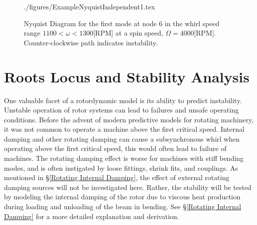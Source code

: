 \begin{figure}
	\def\width{.4\linewidth}
	\def\sep{2.5cm}
	\centering
	{./figures/ExampleNyquistIndependent1.tex}
	\caption{Nyquist Diagram for the first mode at node 6 in the whirl speed range $ 1100 < \omega < 1300 $[RPM] at a spin speed, $ \Omega=4000 $[RPM]. Counter-clockwise path indicates instability.}
	\label{fig:ExampleNyquistIndependent1}
\end{figure}
\section{Roots Locus and Stability Analysis}
One valuable facet of a rotordynamic model is its ability to predict instability. Unstable operation of rotor systems can lead to failures and unsafe operating conditions. Before the advent of modern predictive models for rotating machinery, it was not common to operate a machine above the first critical speed. Internal damping and other rotating damping can cause a subsynchronous whirl when operating above the first critical speed, this would often lead to failure of machines. The rotating damping effect is worse for machines with stiff bending modes, and is often instigated by loose fittings, shrink fits, and couplings. As mentioned in \S\ref{Rotating Internal Damping}, the effect of external rotating damping sources will not be investigated here. Rather, the stability will be tested by modeling the internal damping of the rotor due to viscous heat production during loading and unloading of the beam in bending. See \S\ref{Rotating Internal Damping} for a more detailed explanation and derivation.\par 
